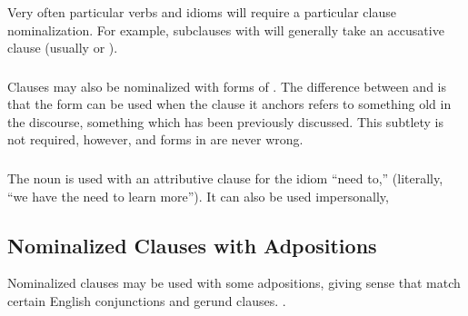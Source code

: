 {\subsubsection{} Very often particular verbs and idioms will require a
particular clause nominalization.  For example, subclauses with
  will generally take an accusative clause (usually
 or ).

\subsubsection{} Clauses may also be nominalized with forms of
.  The difference between  and  is that the
 form can be used when the clause it anchors refers to
something old in the discourse, something which has been previously
discussed.  This subtlety is not required, however, and forms in
 are never wrong. 

\subsubsection{} The noun   is used with an
attributive clause for the idiom ``need to,''   (literally, ``we have the need
to learn more''). 
It can also be used impersonally,  


\subsection{Nominalized Clauses with Adpositions} Nominalized clauses
may be used with some adpositions, giving sense that match certain
English conjunctions and gerund clauses.   .\label{syn:rel:nom-adp}


\subsubsection{}  



}
